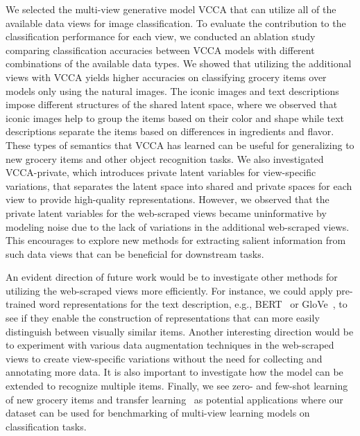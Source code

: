 We selected the multi-view generative model VCCA that can utilize all of the available data views for image classification. 
To evaluate the contribution to the classification performance for each view, we conducted an ablation study comparing classification accuracies between VCCA models with different combinations of the available data types. We showed that utilizing the additional views with VCCA yields higher accuracies on classifying grocery items over models only using the natural images.
The iconic images and text descriptions impose different structures of the shared latent space, where we observed that iconic images help to group the items based on their color and shape while text descriptions separate the items based on differences in ingredients and flavor.
These types of semantics that VCCA has learned can be useful for generalizing to new grocery items and other object recognition tasks. We also investigated VCCA-private, which introduces private latent variables for view-specific variations, that separates the latent space into shared and private spaces for each view to provide high-quality representations. However, we observed that the private latent variables for the web-scraped views became uninformative by modeling noise due to the lack of variations in the additional web-scraped views. This encourages to explore new methods for extracting salient information from such data views that can be beneficial for downstream tasks. 

An evident direction of future work would be to investigate other methods for utilizing the web-scraped views more efficiently. For instance, we could apply pre-trained word representations for the text description, e.g., BERT~\cite{devlin2018bert} or GloVe~\cite{pennington2014glove}, to see if they enable the construction of representations that can more easily distinguish between visually similar items. 
Another interesting direction would be to experiment with various data augmentation techniques in the web-scraped views to create view-specific variations without the need for collecting and annotating more data. It is also important to investigate how the model can be extended to recognize multiple items. Finally, we see zero- and few-shot learning~\cite{xian2018zero} of new grocery items and transfer learning~\cite{pan2010transferlearning} as potential applications where our dataset can be used for benchmarking of multi-view learning models on classification tasks. 
